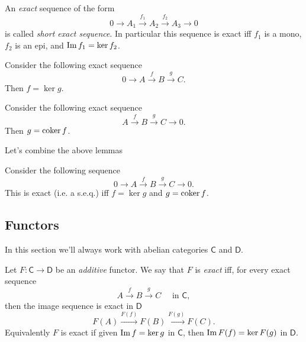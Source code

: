 \begin{defn}
	An {\em exact} sequence of the form
	\begin{equation}
	0 \to A_1 \xrightarrow{f_1} A_2 \xrightarrow{f_2} A_3 \to 0 
	\end{equation} 
	is called {\em short exact sequence}.
	In particular this sequence is exact iff
	$f_1$ is a mono, $f_2$ is an epi, and $\operatorname{Im} f_1 = \ker f_2$.
\end{defn}

\begin{lem}
	Consider the following exact sequence
	\begin{equation}
	0 \to A \xrightarrow{f} B \xrightarrow{g} C
	.\end{equation} 
	Then $f = \ker g$.
\end{lem} 

\begin{lem}
	Consider the following exact sequence
	\begin{equation}
	A \xrightarrow{f} B \xrightarrow{g} C \to 0
	.\end{equation} 
	Then $g = \operatorname{coker} f$.
\end{lem} 
Let's combine the above lemmas

\begin{prop}
	Consider the following sequence
	\begin{equation}
	0 \to A \xrightarrow{f} B \xrightarrow{g} C \to 0
	.\end{equation} 
	This is exact (i.e. a s.e.q.) iff $f = \ker g$ and $g = \operatorname{coker} f$.
\end{prop} 

\subsection{Functors}
In this section we'll always work with abelian categories $\mathsf{C}$ and $\mathsf{D}$.

\begin{defn}
	Let $F: \mathsf{C} \to \mathsf{D}$ be an {\em additive} functor.
	We say that $F$ is {\em exact} iff, for every exact sequence
	\begin{equation}
	A \xrightarrow{f} B \xrightarrow{g} C \quad \text{ in } \mathsf{C}
	,\end{equation} 
	then the image sequence is exact in $\mathsf{D}$ 
	\begin{equation}
	F(A) \xrightarrow{F(f)} F(B) \xrightarrow{F(g)} F(C)
	.\end{equation} 
	Equivalently $F$ is exact if given $\operatorname{Im} f = \ker g$ in $\mathsf{C}$, then
	$\operatorname{Im} F(f) = \ker F(g)$ in $\mathsf{D}$.
\end{defn}

